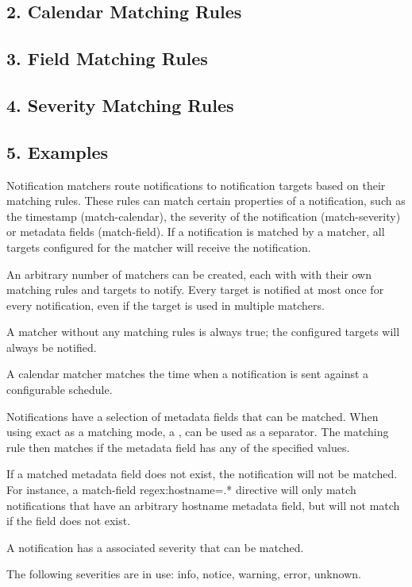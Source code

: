 \subsection{2. Calendar Matching Rules}

\subsection{3. Field Matching Rules}

\subsection{4. Severity Matching Rules}

\subsection{5. Examples}

Notification matchers route notifications to notification targets based on their matching rules. These rules can match certain properties of a notification, such as the timestamp (match-calendar), the severity of the notification (match-severity) or metadata fields (match-field). If a notification is matched by a matcher, all targets configured for the matcher will receive the notification.

An arbitrary number of matchers can be created, each with with their own matching rules and targets to notify. Every target is notified at most once for every notification, even if the target is used in multiple matchers.

A matcher without any matching rules is always true; the configured targets will always be notified.

A calendar matcher matches the time when a notification is sent against a configurable schedule.

Notifications have a selection of metadata fields that can be matched. When using exact as a matching mode, a , can be used as a separator. The matching rule then matches if the metadata field has any of the specified values.

If a matched metadata field does not exist, the notification will not be matched. For instance, a match-field regex:hostname=.* directive will only match notifications that have an arbitrary hostname metadata field, but will not match if the field does not exist.

A notification has a associated severity that can be matched.

The following severities are in use: info, notice, warning, error, unknown.

